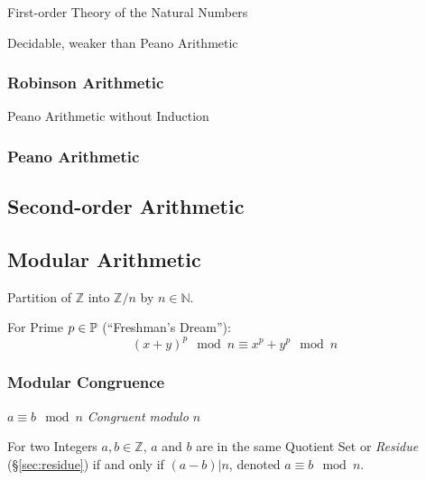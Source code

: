 First-order Theory of the Natural Numbers

Decidable, weaker than Peano Arithmetic



\subsubsection{Robinson Arithmetic}\label{sec:robinson_arithmetic}

Peano Arithmetic without Induction



\subsubsection{Peano Arithmetic}\label{sec:peano_arithmetic}



\subsection{Second-order Arithmetic}\label{sec:second_order_arithmetic}

\subsection{Modular Arithmetic}\label{sec:modular_arithmetic}

Partition of $\mathbb{Z}$ into $\mathbb{Z}/n$ by $n \in \mathbb{N}$.

For Prime $p \in \mathbb{P}$ (``Freshman's Dream''):
\[
  (x+y)^p \mod n \equiv x^p + y^p \mod n
\]



\subsubsection{Modular Congruence}\label{sec:modular_congruence}

$a \equiv b \mod n$ \emph{Congruent modulo $n$}

For two Integers $a,b \in \mathbb{Z}$, $a$ and $b$ are in the same
Quotient Set or \emph{Residue} (\S\ref{sec:residue}) if and only if
$(a - b)|n$, denoted $a \equiv b \mod n$.

